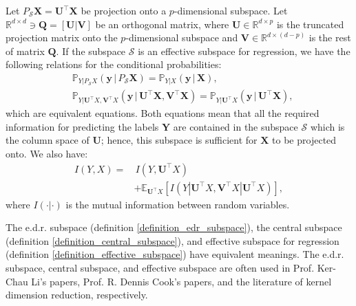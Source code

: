 \documentclass[lang=cn,10pt]{gorgeousnbook}
\numberwithin{equation}{section}%
\numberwithin{figure}{section}%
\begin{document}
\begin{definition}\label{definition_effective_subspace}
Let $P_{\mathcal{S}}\boldsymbol{X} = \boldsymbol{U}^\top \boldsymbol{X}$ be projection onto a $p$-dimensional subspace. 
Let $\mathbb{R}^{d \times d} \ni \boldsymbol{Q} = [\boldsymbol{U} | \boldsymbol{V}]$ be an orthogonal matrix, where $\boldsymbol{U} \in \mathbb{R}^{d \times p}$ is the truncated projection matrix onto the $p$-dimensional subspace and $\boldsymbol{V} \in \mathbb{R}^{d \times (d-p)}$ is the rest of matrix $\boldsymbol{Q}$.
If the subspace $\mathcal{S}$ is an effective subspace for regression, we have the following relations for the conditional probabilities:
\begin{align}
&\mathbb{P}_{Y | P_{\mathcal{S}}X}(\boldsymbol{y}\, |\, P_{\mathcal{S}}\boldsymbol{X}) = \mathbb{P}_{Y | X}(\boldsymbol{y}\, |\, \boldsymbol{X}), \label{equation_effective_subspace_1} \\
&\mathbb{P}_{Y | \boldsymbol{U}^\top X, \boldsymbol{V}^\top X}(\boldsymbol{y}\, |\, \boldsymbol{U}^\top \boldsymbol{X}, \boldsymbol{V}^\top \boldsymbol{X}) = \mathbb{P}_{Y | \boldsymbol{U}^\top X}(\boldsymbol{y}\, |\, \boldsymbol{U}^\top \boldsymbol{X}), \label{equation_effective_subspace_2}
\end{align}
which are equivalent equations.
Both equations mean that all the required information for predicting the labels $\boldsymbol{Y}$ are contained in the subspace $\mathcal{S}$ which is the column space of $\boldsymbol{U}$; hence, this subspace is sufficient for $\boldsymbol{X}$ to be projected onto. 
We also have:
\begin{align*}
I(Y,X) = &\,I(Y,\boldsymbol{U}^\top X) \\
&+ \mathbb{E}_{\boldsymbol{U}^\top X}[I(Y | \boldsymbol{U}^\top X, \boldsymbol{V}^\top X | \boldsymbol{U}^\top X)],
\end{align*}
where $I(\cdot|\cdot)$ is the mutual information between random variables.
\end{definition}

The e.d.r. subspace (definition \ref{definition_edr_subspace}), the central subspace (definition \ref{definition_central_subspace}), and effective subspace for regression (definition \ref{definition_effective_subspace}) have equivalent meanings. 
The e.d.r. subspace, central subspace, and effective subspace are often used in Prof. Ker-Chau Li's papers, Prof. R. Dennis Cook's papers, and the literature of kernel dimension reduction, respectively. 
\end{document}
